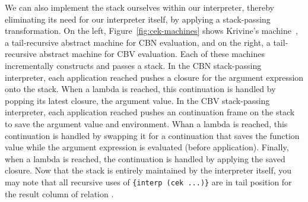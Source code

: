 
%
We can also implement the stack ourselves within our interpreter, thereby eliminating its need for our interpreter itself, by applying a stack-passing transformation.
On the left, Figure~\ref{fig:cek-machines} shows Krivine's machine~\cite{krivine:2007:cbn}, a tail-recursive abstract machine for CBN evaluation, and on the right, a tail-recursive abstract machine for CBV evaluation. Each of these machines incrementally constructs and passes a stack. In the CBN stack-passing interpreter, each application reached pushes a closure for the argument expression onto the stack. When a lambda is reached, this continuation is handled by popping its latest closure, the argument value. In the CBV stack-passing interpreter, each application reached pushes an  continuation frame on the stack to save the argument value and environment. Whan a lambda is reached, this continuation is handled by swapping it for a  continuation that saves the function value while the argument expression is evaluated (before application). Finally, when a lambda is reached, the  continuation is handled by applying the saved closure. Now that the stack is entirely maintained by the interpreter itself, you may note that all recursive uses of \texttt{\{interp (cek ...)\}} are in tail position for the result column of relation . 





